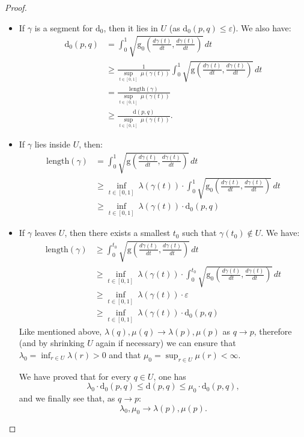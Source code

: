 \documentclass[pdflatex,sn-mathphys-ay]{sn-jnl}%
\newcommand{\dis}{\mathrm{d}}
\newcommand{\g}{\mathrm{g}}
\newcommand{\length}{\mathrm{length}}
\newcommand{\eps}{\varepsilon}
\theoremstyle{thmstyleone}%
\begin{document}
\begin{appendices}
\begin{proof}
\begin{itemize}
\item If $\gamma$ is a segment for $\dis_0$, then it lies in $U$ (as $\dis_0(p,q)\leq\eps$). We also have:
%
\begin{align*}
\dis_0(p,q)&=\int_0^1\sqrt{\g_0\left(\frac{d\gamma(t)}{dt},\frac{d\gamma(t)}{dt}\right)}\, dt\\
&\geq \frac{1}{\sup_{t\in[0,1]}\ \mu(\gamma(t))}\int_0^1\sqrt{\g\left(\frac{d\gamma(t)}{dt},\frac{d\gamma(t)}{dt}\right)}\, dt\\
&=\frac{\length(\gamma)}{\sup_{t\in[0,1]}\ \mu(\gamma(t))}\\
&\geq \frac{\dis(p,q)}{\sup_{t\in[0,1]}\ \mu(\gamma(t))}.
\end{align*}
%
\item If $\gamma$ lies inside $U$, then:
%
\begin{align*}
\length(\gamma)&=\int_0^1\sqrt{\g\left(\frac{d\gamma(t)}{dt},\frac{d\gamma(t)}{dt}\right)}\, dt\\
&\geq \inf_{t\in[0,1]}\ \lambda(\gamma(t)) \cdot \int_0^1\sqrt{\g_0\left(\frac{d\gamma(t)}{dt},\frac{d\gamma(t)}{dt}\right)}\, dt\\
&\geq \inf_{t\in[0,1]}\ \lambda(\gamma(t))\cdot\dis_0(p,q)
\end{align*}
%
\item If $\gamma$ leaves $U$, then there exists a smallest $t_0$ such that $\gamma(t_0)\notin U$. We have:
%
\begin{align*}
\length(\gamma)&\geq\int_0^{t_0}\sqrt{\g\left(\frac{d\gamma(t)}{dt},\frac{d\gamma(t)}{dt}\right)}\, dt\\
&\geq \inf_{t\in[0,1]}\ \lambda(\gamma(t))\cdot\int_0^{t_0}\sqrt{\g_0\left(\frac{d\gamma(t)}{dt},\frac{d\gamma(t)}{dt}\right)}\, dt\\
&\geq \inf_{t\in[0,1]}\ \lambda(\gamma(t))\cdot\eps\\
&\geq \inf_{t\in[0,1]}\ \lambda(\gamma(t))\cdot\dis_0(p,q)
\end{align*}
Like mentioned above, $\lambda(q),\mu(q)\rightarrow \lambda(p),\mu(p)$ as $q\rightarrow p$, therefore (and by shrinking $U$ again if necessary) we can ensure that $\lambda_0=\inf_{r\in U}\lambda(r)>0$ and that $\mu_0=\sup_{r\in U}\mu(r)<\infty$.

We have proved that for every $q\in U$, one has
$$\lambda_0\cdot\dis_0(p,q)\leq \dis(p,q)\leq\mu_0\cdot\dis_0(p,q),$$
and we finally see that, as $q\rightarrow p$:
$$\lambda_0,\mu_0\rightarrow \lambda(p),\mu(p).$$
\end{itemize}


\end{proof}
\end{appendices}
\end{document}
